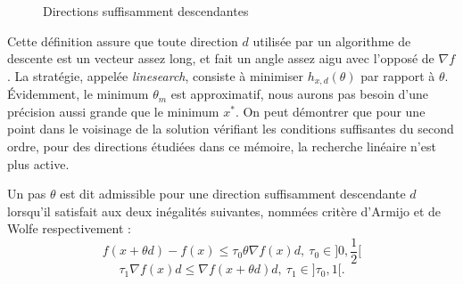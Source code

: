 



\begin{figure}
\caption{Directions suffisamment descendantes}
\begin{center}
  \endpgfgraphicnamed
\end{center}
\end{figure}
\noindent
Cette d\'efinition assure que toute direction $d$ utilis\'ee par un algorithme de descente est un vecteur assez long, et fait un angle assez
aigu avec l'oppos\'e de $\nabla f$. La strat\'egie, appel\'ee {\it linesearch}, consiste \`a minimiser $h_{x,d}(\theta)$ par rapport \`a $\theta$. %
\'Evidemment, le minimum $\theta_m$ est approximatif, nous aurons pas besoin d'une pr\'ecision aussi grande que le minimum $x^*$.
On peut d\'emontrer que pour une point dans le voisinage de la solution v\'erifiant les conditions suffisantes du
second ordre, pour des directions \'etudi\'ees dans ce m\'emoire, la recherche lin\'eaire n'est plus active.






\begin{frdefinition}
\label{def:3}
Un pas $\theta$ est dit admissible pour une direction suffisamment descendante $d$ lorsqu'il satisfait aux deux in\'egalit\'es suivantes, nomm\'ees
 crit\`ere d'Armijo et de Wolfe respectivement :
\begin{equation}
\label{equ:3}
f(x+\theta d)-f(x) \leq \tau_0 \theta \nabla f(x)d, \ \tau_0 \in ]0,\frac{1}{2}[
\tag{Armijo}
\end{equation}
\begin{equation}
\label{equ:4}
\tau_1 \nabla f(x)d \leq  \nabla f(x+\theta d)d , \ \tau_1 \in ]\tau_0,1[.
\tag{Wolfe}
\end{equation}



\end{frdefinition}

